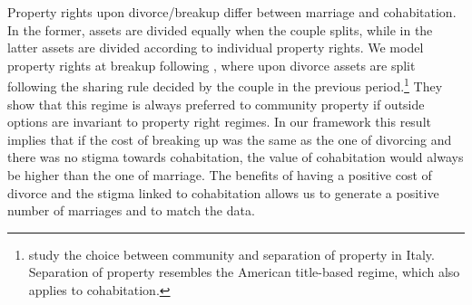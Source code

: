 \documentclass[12pt]{article}
\numberwithin{table}{section}
\begin{document}
 Property rights upon divorce/breakup differ between marriage and cohabitation. In the former, assets are divided equally when the couple splits, while in the latter assets are divided according to individual property rights. We model property rights at breakup following \cite{bayot2015}, where upon divorce assets are split following the sharing rule decided by the couple in the previous period.\footnote{\cite{bayot2015} study the choice between community and separation of property in Italy. Separation of property resembles the American title-based regime, which also applies to cohabitation.} They show that this regime is always preferred to community property if outside options are invariant to property right regimes. In our framework this result implies that if the cost of breaking up was the same as the one of divorcing and there was no stigma towards cohabitation, the value of cohabitation would always be higher than the one of marriage. The benefits of having a positive cost of divorce and the stigma linked to cohabitation allows us to generate a positive number of marriages and to match the data.
\end{document}
